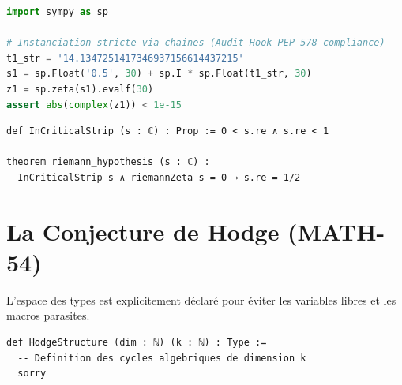\documentclass[11pt,a4paper]{article}
\begin{document}
\begin{lstlisting}[language=Python, caption={Validation Numérique Multiprécision (SymPy)}]
import sympy as sp

# Instanciation stricte via chaines (Audit Hook PEP 578 compliance)
t1_str = '14.1347251417346937156614437215'
s1 = sp.Float('0.5', 30) + sp.I * sp.Float(t1_str, 30)
z1 = sp.zeta(s1).evalf(30)
assert abs(complex(z1)) < 1e-15
\end{lstlisting}

\begin{lstlisting}[language=caml, caption={Spécification Lean 4 - Riemann}]
def InCriticalStrip (s : ℂ) : Prop := 0 < s.re ∧ s.re < 1

theorem riemann_hypothesis (s : ℂ) : 
  InCriticalStrip s ∧ riemannZeta s = 0 → s.re = 1/2
\end{lstlisting}

\section{La Conjecture de Hodge (MATH-54)}
L'espace des types est explicitement déclaré pour éviter les variables libres et les macros parasites.

\begin{lstlisting}[language=caml, caption={Spécification Lean 4 - Hodge (K3 Surfaces)}]
def HodgeStructure (dim : ℕ) (k : ℕ) : Type := 
  -- Definition des cycles algebriques de dimension k
  sorry
\end{lstlisting}
\end{document}
